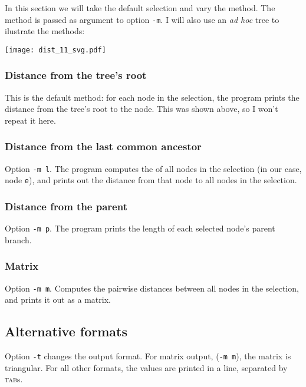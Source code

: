 In this section we will take the default selection and vary the method. The
method is passed as argument to option \texttt{-m}. I will also use an
\emph{ad hoc} tree to ilustrate the methods:

\texttt{[image: dist\_11\_svg.pdf]}

\subsubsection{Distance from the tree's root}

This is the default method: for each node in the selection, the program prints
the distance from the tree's root to the node. This was shown above, so I
won't repeat it here.

\subsubsection{Distance from the last common ancestor}
Option \texttt{-m l}. The program computes the \lca{} of all nodes in the
selection (in our case, node \texttt{e}), and prints out the distance from
that node to all nodes in the selection.



\subsubsection{Distance from the parent}
Option \texttt{-m p}. The program prints the length of each selected node's
parent branch.



\subsubsection{Matrix}
Option \texttt{-m m}. Computes the pairwise distances between all nodes in the
selection, and prints it out as a matrix.



\subsection{Alternative formats}

Option \texttt{-t} changes the output format. For matrix output, (\texttt{-m
m}), the matrix is triangular. For all other formats, the values are printed
in a line, separated by \textsc{tab}s.





